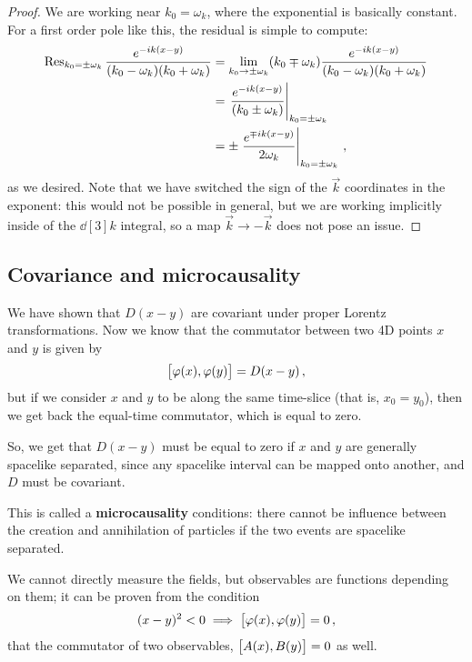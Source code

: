 \documentclass[main.tex]{subfiles}
\begin{document}
\begin{proof}
We are working near \(k_0 = \omega_{k}\), where the exponential is basically constant.
For a first order pole like this, the residual is simple to compute: 
%
\begin{subequations}
\begin{align}
\Res_{k_0 = \pm \omega_{k}} 
\frac{e^{-ik(x-y)}}{(k_0 - \omega_{k}) (k_0 + \omega_{k})}
&= \lim_{k_0 \to \pm \omega_{k}} 
(k_0 \mp \omega_{k})
\frac{e^{-ik(x-y)}}{(k_0 - \omega_{k}) (k_0 + \omega_{k})}  \\
&= \eval{\frac{e^{-ik(x-y)}}{(k_0 \pm \omega_{k})}}_{k_0 = \pm \omega_{k}}  \\
&= \pm \eval{\frac{e^{\mp ik (x-y)}}{2 \omega_{k}}}_{k_0 = \pm \omega_{k}} 
\,,
\end{align}
\end{subequations}
%
as we desired. Note that we have switched the sign of the \(\vec{k}\) coordinates in the exponent: this would not be possible in general, but we are working implicitly inside of the \(\dd[3]{k} \) integral, so a map \(\vec{k} \to - \vec{k}\) does not pose an issue.
\end{proof}

\subsection{Covariance and microcausality} \label{sec:covariance-microcausality}

We have shown that \(D(x-y)\) are covariant under proper Lorentz transformations. Now we know that the commutator between two 4D points \(x\) and \(y\) is given by 
%
\begin{align}
\qty[\varphi (x), \varphi (y)] = D(x-y)
\,,
\end{align}
%
but if we consider \(x\) and \(y\) to be along the same time-slice (that is, \(x_0 = y_0 \)), then we get back the equal-time commutator, which is equal to zero. 

So, we get that \(D(x-y)\) must be equal to zero if \(x\) and \(y\) are generally spacelike separated, since any spacelike interval can be mapped onto another, and \(D\) must be covariant. 

This is called a \textbf{microcausality} conditions: there cannot be influence between the creation and annihilation of particles if the two events are spacelike separated. 

We cannot directly measure the fields, but observables are functions depending on them; it can be proven from the condition 
%
\begin{align}
(x-y)^2<0 \implies
\qty[\varphi (x), \varphi (y)] = 0
\,,
\end{align}
%
that the commutator of two observables, \(\qty[A(x), B(y)] =0\) as well.
\end{document}
